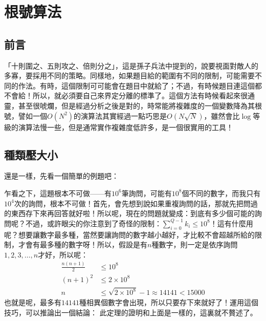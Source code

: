 \documentclass[main.tex]{subfiles}
\begin{document}
\chapter{根號算法}
\section{前言}
	「十則圍之、五則攻之、倍則分之」，這是孫子兵法中提到的，說要視面對敵人的多寡，要採用不同的策略。同樣地，如果題目給的範圍有不同的限制，可能需要不同的作法。有時，這個限制可可能會在題目中就給了；不過，有時候題目連這個都不會給！所以，就必須要自己來界定分離的標準了。這個方法有時候看起來很通靈，甚至很唬爛，但是經過分析之後是對的，時常能將複雜度的一個變數降為其根號，譬如一個$O(N^2)$的演算法其實經過一點巧思是$O(N\sqrt{N})$，雖然會比$\log$等級的演算法慢一些，但是通常實作複雜度低許多，是一個很實用的工具！

\section{種類壓大小}
	還是一樣，先看一個簡單的例題吧：

	乍看之下，這題根本不可做——有$10^6$筆詢問，可能有$10^8$個不同的數字，而我只有$10^4$次的詢問，根本不可做！首先，會先想到說如果重複詢問的話，那就先把問過的東西存下來再回答就好啦！所以呢，現在的問題就變成：到底有多少個可能的詢問呢？不過，或許眼尖的你注意到了奇怪的限制：$\sum^{Q - 1}_{i = 0} k_i \leq 10^8$！這有什麼用呢？想要讓數字最多種，當然要讓詢問的數字越小越好，才比較不會超越所給的限制，才會有最多種的數字呀！所以，假設是有$n$種數字，則一定是依序詢問$1, 2, 3, \dots, n$才好，所以呢：
	\begin{align*}
		\frac{n(n + 1)}{2} &\leq 10^8\\	
		(n + 1)^2 &\leq 2 \times 10^8\\
		n &\leq \sqrt{2 \times 10^8} - 1 \approx 14141 < 15000
	\end{align*}
	也就是呢，最多有$14141$種相異個數字會出現，所以只要存下來就好了！運用這個技巧，可以推論出一個結論：
	此定理的證明和上面是一樣的，這裏就不贅述了。
\end{document}
